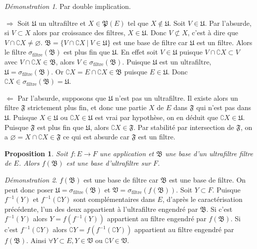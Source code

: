 \documentclass[a4paper, 11pt, french]{book}
\newenvironment{itemise}{\itemize}{\enditemize}
\theoremstyle{plain} %
\newtheorem{proposition}{Proposition}
\theoremstyle{definition} %
\theoremstyle{remark} %
\newtheorem*{demonstration}{Démonstration}
\newcommand{\1}{\mathds{1}}
\newcommand\vide{\varnothing}
\newcommand{\inv}[1]{#1^{-1}}
\newcommand\ou{\text{ ou }}
\newcommand\ens[2]{\{#1 \ |\ #2\}}
\begin{document}
\begin{demonstration}
	Par double implication.
	\begin{itemise}
		\item[$\Rightarrow$] Soit $\mathfrak{U}$ un ultrafiltre et $X\in\mathfrak{P}(E)$ tel que $X\notin\mathfrak{U}$.
		Soit $V\in\mathfrak{U}$.
		Par l'absurde, si $V\subset X$ alors par croissance des filtres, $X\in\mathfrak{U}$.
		Donc $V\not\subset X$, c'est à dire que $V\cap\complement X\neq\vide$.
		$\mathfrak{B}=\ens{V\cap\complement X}{V\in\mathfrak{U}}$ est une base de filtre car $\mathfrak{U}$ est un filtre.
		Alors le filtre $\sigma_\text{filtre}(\mathfrak{B})$ est plus fin que $\mathfrak{U}$.
		En effet soit $V\in\mathfrak{U}$ puisque $V\cap\complement X\subset V$ avec $V\cap\complement X\in\mathfrak{B}$, alors $V\in\sigma_\text{filtre}(\mathfrak{B})$.
		Puisque $\mathfrak{U}$ est un ultrafiltre, $\mathfrak{U}=\sigma_\text{filtre}(\mathfrak{B})$.
		Or $\complement X=E\cap\complement X\in\mathfrak{B}$ puisque $E\in\mathfrak{U}$.
		Donc $\complement X\in\sigma_\text{filtre}(\mathfrak{B})=\mathfrak{U}$.
		\item[$\Leftarrow$] Par l'absurde, supposons que $\mathfrak{U}$ n'est pas un ultrafiltre.
		Il existe alors un filtre $\mathfrak{F}$ strictement plus fin, et donc une partie $X$ de $E$ dans $\mathfrak{F}$ qui n'est pas dans $\mathfrak{U}$.
		Puisque $X\in\mathfrak{U}\ou\complement X\in\mathfrak{U}$ est vrai par hypothèse, on en déduit que $\complement X\in\mathfrak{U}$.
		Puisque $\mathfrak{F}$ est plus fin que $\mathfrak{U}$, alors $\complement X\in\mathfrak{F}$.
		Par stabilité par intersection de $\mathfrak{F}$, on a $\vide=X\cap\complement X\in\mathfrak{F}$ ce qui est absurde car $\mathfrak{F}$ est un filtre.
	\end{itemise}
\end{demonstration}

\begin{proposition}
	Soit $f:E\rightarrow F$ une application et $\mathfrak{B}$ une base d'un ultrafiltre filtre de $E$.
	Alors $f(\mathfrak{B})$ est une base d'ultrafiltre sur $F$.
\end{proposition}

\begin{demonstration}
	$f(\mathfrak{B})$ est une base de filtre car $\mathfrak{B}$ est une base de filtre.
	On peut donc poser $\mathfrak{U}=\sigma_\text{filtre}(\mathfrak{B})$ et $\mathfrak{V}=\sigma_\text{filtre}(f(\mathfrak{B}))$.
	Soit $Y\subset F$.
	Puisque $\inv{f}(Y)$ et $\inv{f}(\complement Y)$ sont complémentaires dans $E$, d'après le caractérisation précédente, l'un des deux appartient à l'ultrafiltre engendré par $\mathfrak{B}$.
	Si c'est $\inv{f}(Y)$ alors $Y=f(\inv{f}(Y))$ appartient au filtre engendré par $f(\mathfrak{B})$.
	Si c'est $\inv{f}(\complement Y)$ alors $\complement Y=f(\inv{f}(\complement Y))$ appartient au filtre engendré par $f(\mathfrak{B})$.
	Ainsi $\forall Y\subset E, Y\in\mathfrak{V}\ou\complement V\in\mathfrak{V}$.
\end{demonstration}
\end{document}
